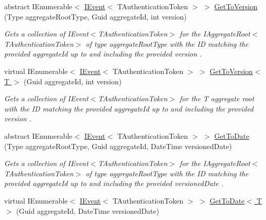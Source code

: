 \begin{DoxyCompactItemize}
abstract I\+Enumerable$<$ \hyperlink{interfaceCqrs_1_1Events_1_1IEvent}{I\+Event}$<$ T\+Authentication\+Token $>$ $>$ \hyperlink{classCqrs_1_1Events_1_1EventStore_a2785f85c9d986cdf11ab6054826c195d_a2785f85c9d986cdf11ab6054826c195d}{Get\+To\+Version} (Type aggregate\+Root\+Type, Guid aggregate\+Id, int version)
\begin{DoxyCompactList}\small\item\em Gets a collection of I\+Event$<$\+T\+Authentication\+Token$>$ for the I\+Aggregate\+Root$<$\+T\+Authentication\+Token$>$ of type {\itshape aggregate\+Root\+Type}  with the ID matching the provided {\itshape aggregate\+Id}  up to and including the provided {\itshape version} . \end{DoxyCompactList}\item 
virtual I\+Enumerable$<$ \hyperlink{interfaceCqrs_1_1Events_1_1IEvent}{I\+Event}$<$ T\+Authentication\+Token $>$ $>$ \hyperlink{classCqrs_1_1Events_1_1EventStore_abbefa3356d8082902bb2b51f2bfab3fc_abbefa3356d8082902bb2b51f2bfab3fc}{Get\+To\+Version$<$ T $>$} (Guid aggregate\+Id, int version)
\begin{DoxyCompactList}\small\item\em Gets a collection of I\+Event$<$\+T\+Authentication\+Token$>$ for the {\itshape T} aggregate root with the ID matching the provided {\itshape aggregate\+Id}  up to and including the provided {\itshape version} . \end{DoxyCompactList}\item 
abstract I\+Enumerable$<$ \hyperlink{interfaceCqrs_1_1Events_1_1IEvent}{I\+Event}$<$ T\+Authentication\+Token $>$ $>$ \hyperlink{classCqrs_1_1Events_1_1EventStore_acc2cf147ad6420c5359485f04367d5d1_acc2cf147ad6420c5359485f04367d5d1}{Get\+To\+Date} (Type aggregate\+Root\+Type, Guid aggregate\+Id, Date\+Time versioned\+Date)
\begin{DoxyCompactList}\small\item\em Gets a collection of I\+Event$<$\+T\+Authentication\+Token$>$ for the I\+Aggregate\+Root$<$\+T\+Authentication\+Token$>$ of type {\itshape aggregate\+Root\+Type}  with the ID matching the provided {\itshape aggregate\+Id}  up to and including the provided {\itshape versioned\+Date} . \end{DoxyCompactList}\item 
virtual I\+Enumerable$<$ \hyperlink{interfaceCqrs_1_1Events_1_1IEvent}{I\+Event}$<$ T\+Authentication\+Token $>$ $>$ \hyperlink{classCqrs_1_1Events_1_1EventStore_a8a7b9c1ae079b28d3fedb4f815d93fb9_a8a7b9c1ae079b28d3fedb4f815d93fb9}{Get\+To\+Date$<$ T $>$} (Guid aggregate\+Id, Date\+Time versioned\+Date)

\end{DoxyCompactItemize}
